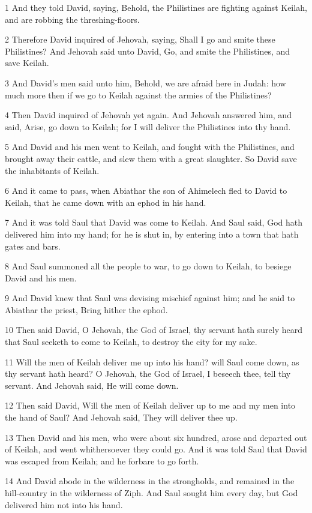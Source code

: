 \par 1 And they told David, saying, Behold, the Philistines are fighting against Keilah, and are robbing the threshing-floors.
\par 2 Therefore David inquired of Jehovah, saying, Shall I go and smite these Philistines? And Jehovah said unto David, Go, and smite the Philistines, and save Keilah.
\par 3 And David's men said unto him, Behold, we are afraid here in Judah: how much more then if we go to Keilah against the armies of the Philistines?
\par 4 Then David inquired of Jehovah yet again. And Jehovah answered him, and said, Arise, go down to Keilah; for I will deliver the Philistines into thy hand.
\par 5 And David and his men went to Keilah, and fought with the Philistines, and brought away their cattle, and slew them with a great slaughter. So David save the inhabitants of Keilah.
\par 6 And it came to pass, when Abiathar the son of Ahimelech fled to David to Keilah, that he came down with an ephod in his hand.
\par 7 And it was told Saul that David was come to Keilah. And Saul said, God hath delivered him into my hand; for he is shut in, by entering into a town that hath gates and bars.
\par 8 And Saul summoned all the people to war, to go down to Keilah, to besiege David and his men.
\par 9 And David knew that Saul was devising mischief against him; and he said to Abiathar the priest, Bring hither the ephod.
\par 10 Then said David, O Jehovah, the God of Israel, thy servant hath surely heard that Saul seeketh to come to Keilah, to destroy the city for my sake.
\par 11 Will the men of Keilah deliver me up into his hand? will Saul come down, as thy servant hath heard? O Jehovah, the God of Israel, I beseech thee, tell thy servant. And Jehovah said, He will come down.
\par 12 Then said David, Will the men of Keilah deliver up to me and my men into the hand of Saul? And Jehovah said, They will deliver thee up.
\par 13 Then David and his men, who were about six hundred, arose and departed out of Keilah, and went whithersoever they could go. And it was told Saul that David was escaped from Keilah; and he forbare to go forth.
\par 14 And David abode in the wilderness in the strongholds, and remained in the hill-country in the wilderness of Ziph. And Saul sought him every day, but God delivered him not into his hand.
